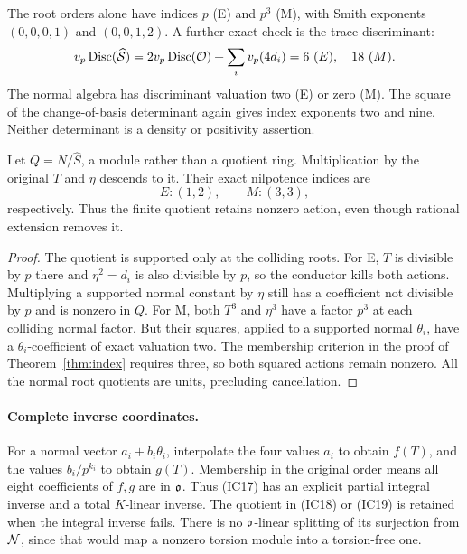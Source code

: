 The root orders alone have indices $p$ (E) and $p^3$ (M), with Smith exponents
$(0,0,0,1)$ and $(0,0,1,2)$. A further exact check is the trace discriminant:
\[
 v_p\operatorname{Disc}(\widehat{\mathcal S})=2v_p\operatorname{Disc}(\mathcal O)+\sum_iv_p(4d_i)
 =6\ (E),\quad18\ (M).
\]
The normal algebra has discriminant valuation two (E) or zero (M). The square
of the change-of-basis determinant again gives index exponents two and nine.
Neither determinant is a density or positivity assertion.

\begin{corollary}
Let $Q=N/\widehat S$, a module rather than a quotient ring. Multiplication by the
original $T$ and $\eta$ descends to it. Their exact nilpotence indices are
\[
 E:(1,2),\qquad M:(3,3),                                \tag{IC20a}
\]
respectively. Thus the finite quotient retains nonzero action, even though
rational extension removes it.
\end{corollary}
\begin{proof}
The quotient is supported only at the colliding roots. For E, $T$ is divisible
by $p$ there and $\eta^2=d_i$ is also divisible by $p$, so the conductor kills
both actions. Multiplying a supported normal constant by $\eta$ still has a
coefficient not divisible by $p$ and is nonzero in $Q$.
For M, both $T^3$ and $\eta^3$ have a factor $p^3$ at each colliding normal
factor. But their squares, applied to a supported normal $\theta_i$, have a
$\theta_i$-coefficient of exact valuation two. The membership criterion in the
proof of Theorem~\ref{thm:index} requires three, so both squared actions remain
nonzero. All the normal root quotients are units, precluding cancellation.
\end{proof}

\paragraph{Complete inverse coordinates.}
For a normal vector $a_i+b_i\theta_i$, interpolate the four values $a_i$ to
obtain $f(T)$, and the values $b_i/p^{k_i}$ to obtain $g(T)$. Membership in the
original order means all eight coefficients of $f,g$ are in $\mathfrak o$. Thus (IC17)
has an explicit partial integral inverse and a total $K$-linear inverse.
The quotient in (IC18) or (IC19) is retained when the integral inverse fails.
There is no $\mathfrak o$-linear splitting of its surjection from $\mathcal N$, since that
would map a nonzero torsion module into a torsion-free one.

